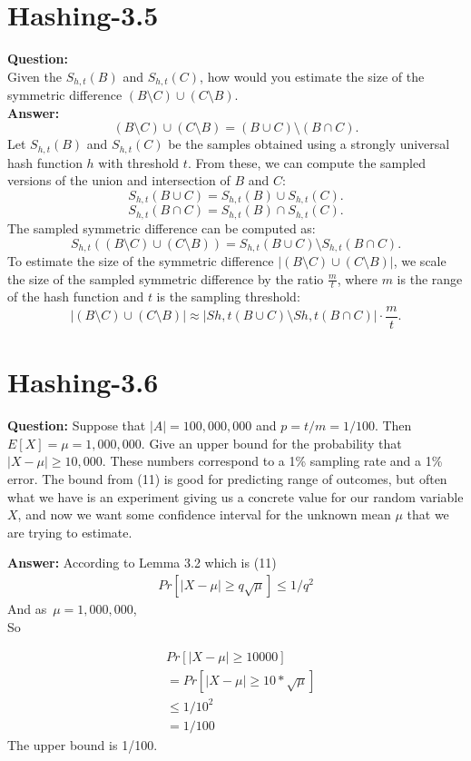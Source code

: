 \documentclass[12pt]{article}
\begin{document}
\section{Hashing-3.5}
\textbf{Question:}\\ Given the \( S_{h,t}(B) \) and \( S_{h,t}(C) \), how would you estimate the size of the symmetric difference \( (B \setminus C) \cup (C \setminus B) \).\\
\textbf{Answer:}\\
\[
(B \setminus C) \cup (C \setminus B) = (B \cup C) \setminus (B \cap C).
\]
Let \( S_{h,t}(B) \) and \( S_{h,t}(C) \) be the samples obtained using a strongly universal hash function \( h \) with threshold \( t \). From these, we can compute the sampled versions of the union and intersection of \( B \) and \( C \):
    \[
    S_{h,t}(B \cup C) = S_{h,t}(B) \cup S_{h,t}(C).
    \]
    \[
    S_{h,t}(B \cap C) = S_{h,t}(B) \cap S_{h,t}(C).
    \]
The sampled symmetric difference can be computed as:
\[
S_{h,t}((B \setminus C) \cup (C \setminus B)) = S_{h,t}(B \cup C) \setminus S_{h,t}(B \cap C).
\]
To estimate the size of the symmetric difference \( |(B \setminus C) \cup (C \setminus B)| \), we scale the size of the sampled symmetric difference by the ratio \( \frac{m}{t} \), where \( m \) is the range of the hash function and \( t \) is the sampling threshold:
\[
|(B \setminus C) \cup (C \setminus B)| \approx \left| Sh,t(B \cup C) \setminus Sh,t(B \cap C) \right| \cdot \frac{m}{t}.
\]
\section{Hashing-3.6}
\textbf{Question:}
Suppose that $|A| = 100,000,000$ and $p = t/m = 1/100$. Then $E[X] = \mu = 1,000,000$. Give an upper bound for the probability that $|X - \mu| \geq 10,000$. These numbers correspond to a 1\% sampling rate and a 1\% error. 
The bound from (11) is good for predicting range of outcomes, but often what we have is an experiment giving us a concrete value for our random variable $X$, and now we want some confidence interval for the unknown mean $\mu$ that we are trying to estimate.

\textbf{Answer:}
According to Lemma 3.2 which is (11)
\begin{align}
    Pr[|X - \mu| \geq q\sqrt{\mu}] \leq 1 / q^2
\end{align}
And as \,$\mu = 1,000,000$,\\
So 

\begin{equation}
\begin{aligned}
    &Pr[|X - \mu| \geq 10000]\\
    &=  Pr[|X - \mu| \geq 10 *\sqrt{\mu}]\\
    & \leq 1/10^2\\
    &= 1/100
\end{aligned}
\end{equation}
The upper bound is 1/100.
\end{document}
